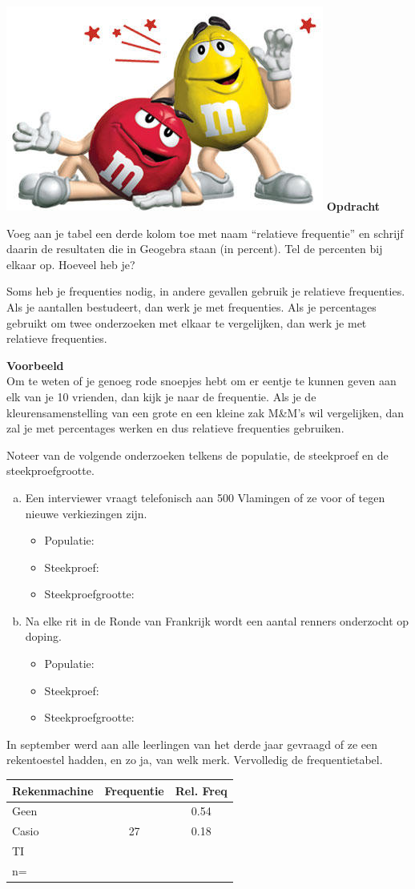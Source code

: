 \documentclass[12pt,twoside]{article}
\newcounter{nmmopdracht}
\newenvironment{mmopdracht}
{
  \stepcounter{nmmopdracht}
  \vspace*{0.7cm}
  \begin{minipage}{\textwidth}
  {%
  \hspace*{-\marginparwidth}\includegraphics[width=\marginparwidth]{mmopdracht}
  \large\bf Opdracht \arabic{nmmopdracht}}
}{%
  \end{minipage}
}
\begin{document}
\begin{mmopdracht}
Voeg aan je tabel een derde kolom toe met naam “relatieve frequentie” en schrijf daarin de
resultaten die in Geogebra staan (in percent). Tel de percenten bij elkaar op. Hoeveel heb je?
\end{mmopdracht}

Soms heb je frequenties nodig, in andere gevallen gebruik je relatieve frequenties. Als je aantallen
bestudeert, dan werk je met frequenties. Als je percentages gebruikt om twee onderzoeken met
elkaar te vergelijken, dan werk je met relatieve frequenties.

{\bf Voorbeeld}\\
Om te weten of je genoeg rode snoepjes hebt om er eentje te kunnen geven aan elk van je 10
vrienden, dan kijk je naar de frequentie.
Als je de kleurensamenstelling van een grote en een kleine zak M\&M’s wil vergelijken, dan zal je
met percentages werken en dus relatieve frequenties gebruiken.

\begin{oefening}
Noteer van de volgende onderzoeken telkens de populatie, de steekproef en de steekproefgrootte.
\begin{enumerate}[(a)]
  \item Een interviewer vraagt telefonisch aan 500 Vlamingen of ze voor of tegen nieuwe verkiezingen zijn.
  \begin{itemize}
    \itemsep0.5em
    \item Populatie: \arulefill
    \item Steekproef: \arulefill
    \item Steekproefgrootte: \arulefill
  \end{itemize}
  \item Na elke rit in de Ronde van Frankrijk wordt een aantal renners onderzocht op doping.
  \begin{itemize}
    \itemsep0.5em
    \item Populatie: \arulefill
    \item Steekproef: \arulefill
    \item Steekproefgrootte: \arulefill
  \end{itemize}
\end{enumerate}
\end{oefening}

\begin{oefening}
In september werd aan alle leerlingen van het derde jaar gevraagd of ze een rekentoestel hadden, en zo ja, van welk merk. Vervolledig de frequentietabel.
\begin{center}
\begin{tabular}{l|c|c}
Rekenmachine & Frequentie & Rel. Freq\\\hline
Geen & & 0.54\\\hline
Casio & 27 & 0.18\\\hline
TI & &\\\hline
n= & &\\
\end{tabular}
\end{center}
\end{oefening}
\end{document}
